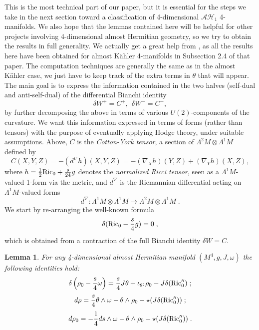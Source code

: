 \documentclass{amsart}
\newtheorem{lemma}[theorem]{Lemma}
\newcommand{\na}{\nabla}
\begin{document}
This is the most technical part of our paper, but it is essential for the steps we take in the next section toward a classification of 4-dimensional $\mathcal{AH}_1$ 4-manifolds. We also hope that the lemmas contained here will be helpful for other projects involving 4-dimensional almost Hermitian geometry, so we try to obtain the results in full generality. We actually get a great help from \cite{AAD}, as all the results here have been obtained for almost K\"ahler 4-manifolds in Subsection 2.4 of that paper. The computation techniques are generally the same as in the almost K\"ahler case, we just have to keep track of the extra terms in $\theta$ that will appear. The main goal is to express the information contained in the two halves (self-dual and anti-self-dual) of the differential Bianchi identity
\begin{equation*}\label{bianchipm}
 \delta W ^+  = C ^+, \ \  \delta W ^-  = C ^- ,
\end{equation*}
by further decomposing the above in terms of various $U(2)$-components of the curvature. We want this information expressed in terms of forms (rather than tensors) with the purpose of eventually applying Hodge theory, under suitable assumptions. Above, $C$ is the {\it Cotton-York tensor}, a section of $\Lambda^2 M \otimes \Lambda^1 M$ defined by
$$C(X, Y, Z) = - (d^{\na} h)(X, Y, Z) = - (\nabla _X h )(Y, Z) + (\nabla_Y h)(X, Z),$$ 
where $h = \frac{1}{2}  {\rm Ric}_0 + \frac{s}{24} g$ denotes the {\it normalized Ricci tensor}, seen as a $\Lambda^1 M$-valued 1-form via the metric, and $d^{\na}$ is the
Riemannian differential acting on $\Lambda^1M$-valued forms
$$ d^{\na} : \Lambda^1 M \otimes \Lambda^1 M \rightarrow \Lambda^2 M \otimes \Lambda^1 M \; .$$
We start by re-arranging  the well-known formula
$$\delta ({\rm Ric}_0 - \frac{s}{4} g) = 0 \; ,$$
which is obtained from a contraction of the full Bianchi identity $\delta W = C$. 
\begin{lemma} \label{RicformBianchi}
For any 4-dimensional almost Hermitian manifold $(M^4, g, J, \omega)$ the following identities hold:
\begin{equation} \label{deltarho0}
\delta \left( \rho_0 - \frac{s}{4}  \omega \right)  =  \frac{s}{4} J\theta + \iota_{\theta^\sharp} \rho_0 - J\delta ({\rm Ric}_0'') \; ;
\end{equation}
\begin{equation} \label{drho}
    d \rho = \frac{s}{4} \theta \wedge \omega - \theta \wedge \rho_0  - \star (J\delta ({\rm Ric}_0'') )          \; ;
\end{equation}
\begin{equation} \label{drho0}
  d \rho_0 = - \frac{1}{4} ds \wedge \omega - \theta \wedge \rho_0   - \star (J\delta ({\rm Ric}_0'') )          \; .
\end{equation}
\end{lemma}
\end{document}
